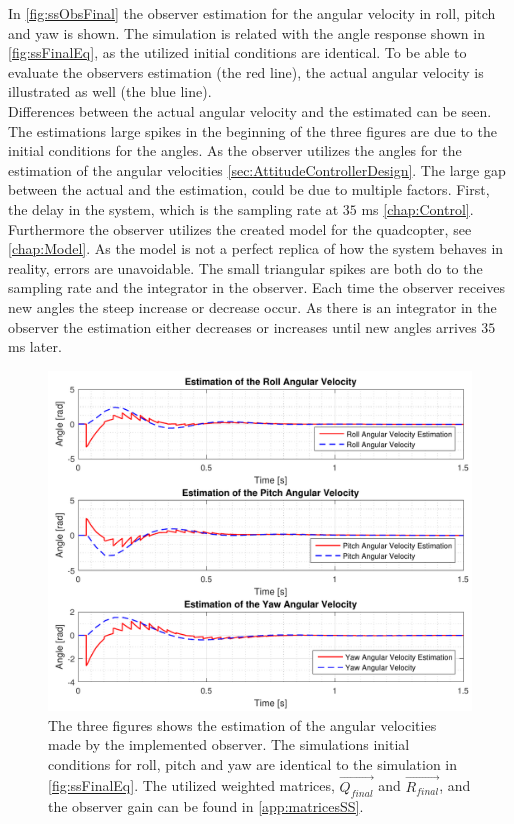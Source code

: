 In \autoref{fig:ssObsFinal} the observer estimation for the angular velocity in roll, pitch and yaw is shown. The simulation is related with the angle response shown in \autoref{fig:ssFinalEq}, as the utilized initial conditions are identical. To be able to evaluate the observers estimation (the red line), the actual angular velocity is illustrated as well (the blue line). \\ Differences between the actual angular velocity and the estimated can be seen. The estimations large spikes in the beginning of the three figures are due to the initial conditions for the angles. As the observer utilizes the angles for the estimation of the angular velocities \autoref{sec:AttitudeControllerDesign}. The large gap between the actual and the estimation, could be due to multiple factors. First, the delay in the system, which is the sampling rate at $35$ \si{ms} \autoref{chap:Control}. Furthermore the observer utilizes the created model for the quadcopter, see \autoref{chap:Model}. As the model is not a perfect replica of how the system behaves in reality, errors are unavoidable. The small triangular spikes are both do to the sampling rate and the integrator in the observer. Each time the observer receives new angles the steep increase or decrease occur. As there is an integrator in the observer the estimation either decreases or increases until new angles arrives $35$ \si{ms} later.

\begin{figure}[H]
	\centering
	\includegraphics[scale=0.7]{figures/ssObsFinal.pdf}
	\caption{The three figures shows the estimation of the angular velocities made by the implemented observer. The simulations initial conditions for roll, pitch and yaw are identical to the simulation in \autoref{fig:ssFinalEq}. The utilized weighted matrices, $\vec{Q_{final}}$ and $\vec{R_{final}}$, and the observer gain can be found in \autoref{app:matricesSS}.}
	\label{fig:ssObsFinal}
\end{figure}

